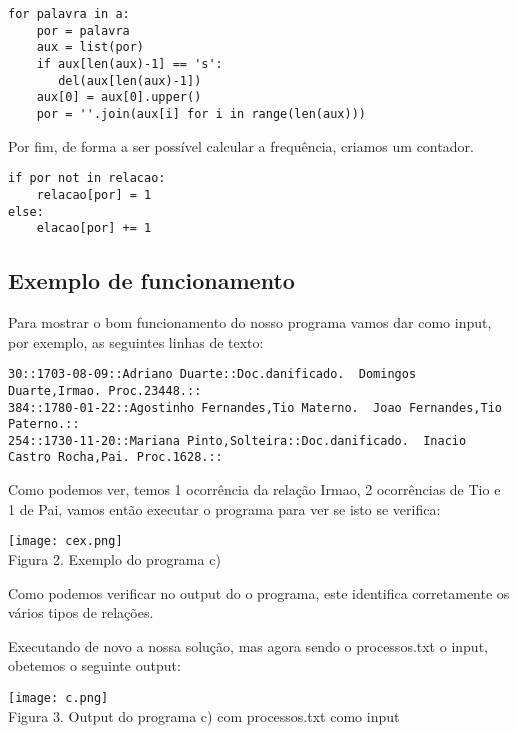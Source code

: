 \documentclass[11pt,a4paper]{report}%
\begin{document}
\begin{verbatim}
for palavra in a:
    por = palavra
    aux = list(por)
    if aux[len(aux)-1] == 's': 
       del(aux[len(aux)-1])
    aux[0] = aux[0].upper()
    por = ''.join(aux[i] for i in range(len(aux)))
\end{verbatim}

Por fim, de forma a ser possível calcular a frequência, criamos um contador.

\begin{verbatim}
if por not in relacao: 
    relacao[por] = 1 
else: 
    elacao[por] += 1 
\end{verbatim}

\subsection{Exemplo de funcionamento}


Para mostrar o bom funcionamento do nosso programa vamos dar como input, por exemplo, as seguintes linhas de texto:

\begin{verbatim}
30::1703-08-09::Adriano Duarte::Doc.danificado.  Domingos Duarte,Irmao. Proc.23448.::
384::1780-01-22::Agostinho Fernandes,Tio Materno.  Joao Fernandes,Tio Paterno.::
254::1730-11-20::Mariana Pinto,Solteira::Doc.danificado.  Inacio Castro Rocha,Pai. Proc.1628.::
\end{verbatim}

Como podemos ver, temos 1 ocorrência da relação Irmao, 2 ocorrências de Tio e 1 de Pai, vamos então executar o programa para ver se isto se verifica:

\begin{center}
    \texttt{[image: cex.png]}
    \\
    \caption{Figura 2. Exemplo do programa c)}
\end{center}

Como podemos verificar no output do o programa, este identifica corretamente os vários tipos de relações.

\newpage

Executando de novo a nossa solução, mas agora sendo o processos.txt o input, obetemos o seguinte output:

\begin{center}
    \texttt{[image: c.png]}
    \\
    \caption{Figura 3. Output do programa c) com processos.txt como input}
\end{center}
\end{document}
